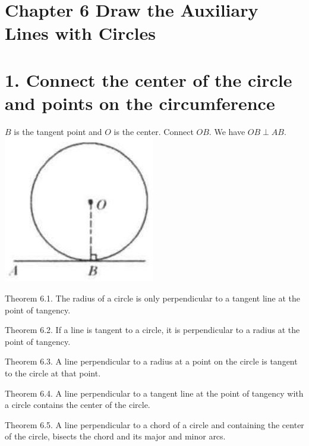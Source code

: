 \documentclass[10pt]{article}
\begin{document}
\section*{Chapter 6 Draw the Auxiliary Lines with Circles}
\section*{1. Connect the center of the circle and points on the circumference}
\(B\) is the tangent point and \(O\) is the center. Connect \(O B\). We have \(O B \perp A B\).\\
\includegraphics[max width=\textwidth, center]{2025_04_17_97bc1f7e44d93c271a88g-146}

Theorem 6.1. The radius of a circle is only perpendicular to a tangent line at the point of tangency.

Theorem 6.2. If a line is tangent to a circle, it is perpendicular to a radius at the point of tangency.

Theorem 6.3. A line perpendicular to a radius at a point on the circle is tangent to the circle at that point.

Theorem 6.4. A line perpendicular to a tangent line at the point of tangency with a circle contains the center of the circle.

Theorem 6.5. A line perpendicular to a chord of a circle and containing the center of the circle, bisects the chord and its major and minor arcs.
\end{document}
